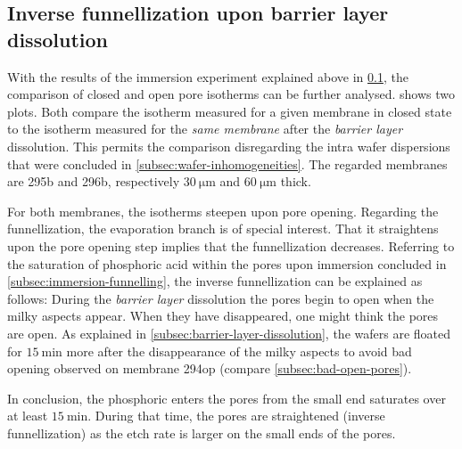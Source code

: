 \documentclass[../thesis.tex]{subfiles}
\begin{document}
          


        \subsection{Inverse funnellization upon barrier layer dissolution}
        \label{subsec:inverse-funnelling}

          With the results of the immersion experiment explained above in \cref{subsec:inverse-funnelling}, the comparison of closed and open pore isotherms can be further analysed.  shows two plots. Both compare the isotherm measured for a given membrane in closed state to the isotherm measured for the \textit{same membrane} after the \textit{barrier layer} dissolution. This permits the comparison disregarding the intra wafer dispersions that were concluded in \cref{subsec:wafer-inhomogeneities}. The regarded membranes are 295b and 296b, respectively $\SI{30}{\micro\meter}$ and $\SI{60}{\micro\meter}$ thick.

          

          For both membranes, the isotherms steepen upon pore opening. Regarding the funnellization, the evaporation branch is of special interest. That it straightens upon the pore opening step implies that the funnellization decreases. Referring to the saturation of phosphoric acid within the pores upon immersion concluded in \cref{subsec:immersion-funnelling}, the inverse funnellization can be explained as follows: During the \textit{barrier layer} dissolution the pores begin to open when the milky aspects appear. When they have disappeared, one might think the pores are open. As explained in \cref{subsec:barrier-layer-dissolution}, the wafers are floated for $\SI{15}{\minute}$ more after the disappearance of the milky aspects to avoid bad opening observed on membrane 294op (compare \cref{subsec:bad-open-pores}).

          In conclusion, the phosphoric enters the pores from the small end saturates over at least $\SI{15}{\minute}$. During that time, the pores are straightened (inverse funnellization) as the etch rate is larger on the small ends of the pores.
          \medskip
\end{document}
